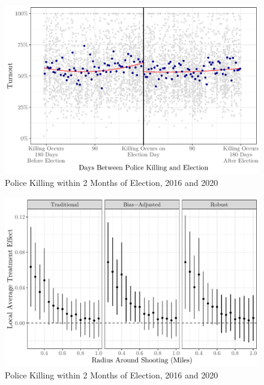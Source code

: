 \documentclass[
  12pt,
]{article}
\begin{document}
\begin{figure}[h]

{\centering \includegraphics{shoot_to_files/figure-latex/rd-plot-1} 

}

\caption{\label{fig:map}Police Killing within 2 Months of Election, 2016 and 2020}\label{fig:rd-plot}
\end{figure}

\begin{figure}[h]

{\centering \includegraphics{shoot_to_files/figure-latex/dists-1} 

}

\caption{\label{fig:map}Police Killing within 2 Months of Election, 2016 and 2020}\label{fig:dists}
\end{figure}
\end{document}
